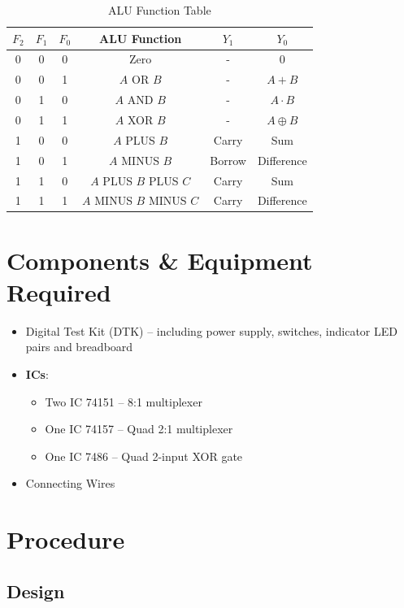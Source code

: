\documentclass[11pt, a4paper]{article}
\begin{document}
\begin{table}[H]
    \centering
    \begin{tabular}{|ccc|c|c|c|}
        \hline
        $F_2$ & $F_1$ & $F_0$ & ALU Function & $Y_1$ & $Y_0$ \\
        \hline
        0 & 0 & 0 & Zero & - & $0$\\
        \hline
        0 & 0 & 1 & $A$ OR $B$ & - & $A + B$\\
        \hline
        0 & 1 & 0 & $A$ AND $B$ & - & $A \cdot B$\\
        \hline
        0 & 1 & 1 & $A$ XOR $B$ & - & $A \oplus B$\\
        \hline
        1 & 0 & 0 & $A$ PLUS $B$ & Carry & Sum \\
        \hline
        1 & 0 & 1 & $A$ MINUS $B$ & Borrow & Difference \\
        \hline
        1 & 1 & 0 & $A$ PLUS $B$ PLUS $C$ & Carry & Sum \\
        \hline
        1 & 1 & 1 & $A$ MINUS $B$ MINUS $C$ & Carry & Difference \\
        \hline
    \end{tabular}
    \caption{ALU Function Table}
\end{table}

\section{Components \& Equipment Required}
\begin{itemize}
    \item Digital Test Kit (DTK) -- including power supply, switches, indicator LED pairs and breadboard
    \item \textbf{ICs}:
    \begin{itemize}[label=$\circ$]
        \item Two IC 74151 -- 8:1 multiplexer 
        \item One IC 74157 -- Quad 2:1 multiplexer
        \item One IC 7486 -- Quad 2-input XOR gate
    \end{itemize}
    \item Connecting Wires
\end{itemize}

\section{Procedure}

\subsection{Design}
\end{document}
